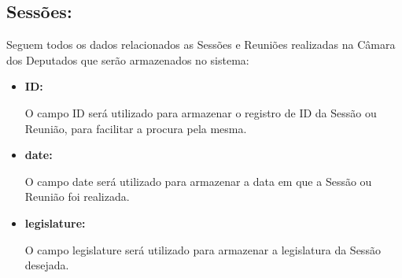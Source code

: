 \subsection{Sessões:}
	
	Seguem todos os dados relacionados as Sessões e Reuniões realizadas na Câmara dos Deputados que serão armazenados no sistema:

	\begin{itemize}
		\item \textbf{ID:}

			O campo ID será utilizado para armazenar o registro de ID da Sessão ou Reunião, para facilitar a procura pela mesma.

		\item \textbf{date:}

			O campo date será utilizado para armazenar a data em que a Sessão ou Reunião foi realizada.

		\item \textbf{legislature:}

			O campo legislature será utilizado para armazenar a legislatura da Sessão desejada.

	\end{itemize}